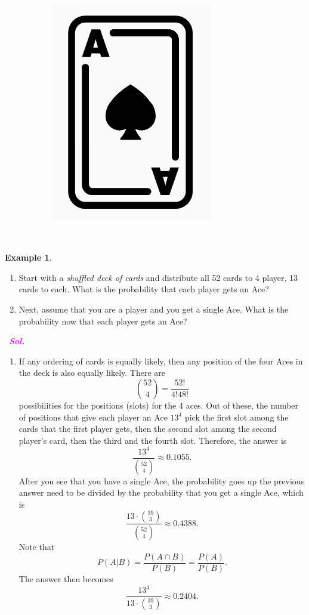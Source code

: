 \documentclass[12pt,a4paper]{article}
\theoremstyle{definition}
\newtheorem{example}{Example}[section]
\theoremstyle{definition}
\theoremstyle{definition}
\theoremstyle{definition}
\theoremstyle{remark}
\theoremstyle{definition}
\newcommand{\dispsty}{\displaystyle}
\newcommand{\sol}{\textcolor{magenta}{\bf \textit{Sol.}}\quad}
\begin{document}
\begin{figure}[h!]
\begin{subfigure}{.3\textwidth}
		\includegraphics[width=.5\linewidth]{cards.png}
	\end{subfigure}%
\end{figure}\
\newpage
\hypertarget{example1.1}{}\begin{example}\
	\begin{enumerate}
		\item Start with a \textit{shuffled deck of cards} and distribute all 52 cards to 4 player, 13 cards to each. What is the probability that each player gets an Ace?
		\item Next, assume that you are a player and you get a single Ace. What is the probability now that each player gets an Ace?
	\end{enumerate}\ \sol\begin{enumerate}
	\item If any ordering of cards is equally likely, then any position of the four Aces in the deck is also equally likely. There are \[
	\binom{52}{4}=\frac{52!}{4!48!}
	\] possibilities for the positions (slots) for the 4 aces. Out of these, the number of positions that give each player an Ace $13^4$ pick the first slot among the cards that the first player gets, then the second slot among the second player's card, then the third and the fourth slot. Therefore, the answer is \[
	\frac{13^4}{\dispsty\binom{52}{4}}\approx0.1055.
	\] After you see that you have a single Ace, the probability goes up the previous answer need to be divided by the probability that you get a single Ace, which is \[
	\frac{\dispsty13\cdot\binom{39}{3}}{\dispsty\binom{52}{4}}\approx0.4388.
	\] Note that \[
	P(A|B)=\frac{P(A\cap B)}{P(B)}=\frac{P(A)}{P(B)}.
	\] The answer then becomes \[
	\frac{13^4}{13\cdot\dispsty\binom{39}{3}}\approx0.2404.
	\]
\end{enumerate}
\end{example}\
\end{document}
